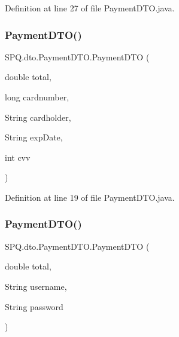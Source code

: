 Definition at line 27 of file Payment\+D\+T\+O.\+java.

\mbox{\label{class_s_p_q_1_1dto_1_1_payment_d_t_o_a4a6f91d0976ce0af97a8f7f15658294c}} 
\subsubsection{\texorpdfstring{Payment\+D\+T\+O()}{PaymentDTO()}\hspace{0.1cm}{\footnotesize\ttfamily [3/6]}}
{\footnotesize\ttfamily S\+P\+Q.\+dto.\+Payment\+D\+T\+O.\+Payment\+D\+TO (\begin{DoxyParamCaption}\item[{double}]{total,  }\item[{long}]{cardnumber,  }\item[{String}]{cardholder,  }\item[{String}]{exp\+Date,  }\item[{int}]{cvv }\end{DoxyParamCaption})}



Definition at line 19 of file Payment\+D\+T\+O.\+java.

\mbox{\label{class_s_p_q_1_1dto_1_1_payment_d_t_o_ab51beb9eef60e0b57b11bab85ce42454}} 
\subsubsection{\texorpdfstring{Payment\+D\+T\+O()}{PaymentDTO()}\hspace{0.1cm}{\footnotesize\ttfamily [4/6]}}
{\footnotesize\ttfamily S\+P\+Q.\+dto.\+Payment\+D\+T\+O.\+Payment\+D\+TO (\begin{DoxyParamCaption}\item[{double}]{total,  }\item[{String}]{username,  }\item[{String}]{password }\end{DoxyParamCaption})}



